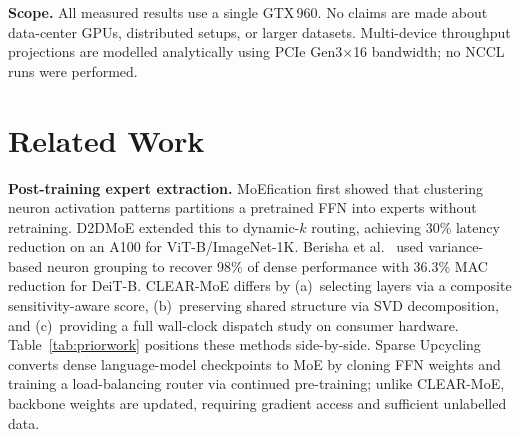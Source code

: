 \documentclass[conference]{IEEEtran}
\begin{document}
\noindent\textbf{Scope.} All measured results use a single GTX\,960. No claims are made about data-center GPUs, distributed setups, or larger datasets. Multi-device throughput projections are modelled analytically using PCIe Gen3$\times$16 bandwidth; no NCCL runs were performed.

\section{Related Work}
\label{sec:related}

\textbf{Post-training expert extraction.} MoEfication \cite{zhang2022moefication} first showed that clustering neuron activation patterns partitions a pretrained FFN into experts without retraining. D2DMoE \cite{d2dmoe2024} extended this to dynamic-$k$ routing, achieving 30\% latency reduction on an A100 for ViT-B/ImageNet-1K. Berisha et al.\ \cite{berisha2025cvpr} used variance-based neuron grouping to recover 98\% of dense performance with 36.3\% MAC reduction for DeiT-B. CLEAR-MoE differs by (a)~selecting layers via a composite sensitivity-aware score, (b)~preserving shared structure via SVD decomposition, and (c)~providing a full wall-clock dispatch study on consumer hardware. Table~\ref{tab:priorwork} positions these methods side-by-side. Sparse Upcycling \cite{komatsuzaki2023sparse} converts dense language-model checkpoints to MoE by cloning FFN weights and training a load-balancing router via continued pre-training; unlike CLEAR-MoE, backbone weights are updated, requiring gradient access and sufficient unlabelled data.
\end{document}
